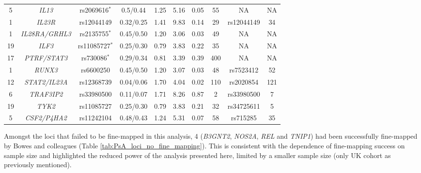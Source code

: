 \begin{landscape}
\begin{center}
\begin{longtable}[ht]{c c c c c c c c c c}
5	 &\textit{IL13}	         &rs2069616$^{\ast}$	  &0.5/0.44	  &1.25	&5.16	&0.05	&55	&NA	 &NA \\
1	 &\textit{IL23R}	       &rs12044149	          &0.32/0.25	&1.41	&9.83	&0.14	&29	&rs12044149	&34 \\
1	 &\textit{IL28RA/GRHL3}  &rs2135755$^{\ast}$	  &0.45/0.50	&1.20	&3.06	&0.03	&49	&NA	&NA \\
19 &\textit{ILF3}	         &rs11085727$^{\ast}$	  &0.25/0.30	&0.79	&3.83	&0.22	&35	&NA	&NA \\
17 &\textit{PTRF/STAT3}    &rs730086$^{\ast}$     &0.29/0.34 &0.81 &3.39 &0.39 &400	&NA	&NA \\
1	 & \textit{RUNX3}	       & rs6600250	          &0.45/0.50	&1.20	&3.07	&0.03	&48	&rs7523412	&52 \\
12 &\textit{STAT2/IL23A}	 &rs12368739	          &0.04/0.06	&1.70	&4.04	&0.02	&110 &	rs2020854	&121 \\
6	 & \textit{TRAF3IP2}	   &rs33980500	          &0.11/0.07	&1.71	&8.26	&0.87	&2	&rs33980500	&7 \\
19 &	\textit{TYK2}	       &rs11085727	          &0.25/0.30	&0.79	&3.83	&0.21	&32	&rs34725611	&5 \\
5	 & \textit{CSF2/P4HA2}	 &rs11242104            &0.48/0.43 &1.24 &5.31 &0.07 &58	&rs715285 &35 \\
\bottomrule
\end{longtable}
\end{center}
\end{landscape}



Amongst the loci that failed to be fine-mapped in this analysis, 4 (\textit{B3GNT2}, \textit{NOS2A}, \textit{REL} and \textit{TNIP1}) had been successfully fine-mapped by Bowes and colleagues (Table \ref{tab:PsA_loci_no_fine_mapping}). This is consistent with the dependence of fine-mapping success on sample size \parencite{Bunt2015} and highlighted the reduced power of the analysis presented here, limited by a smaller sample size (only UK cohort as previously mentioned).


